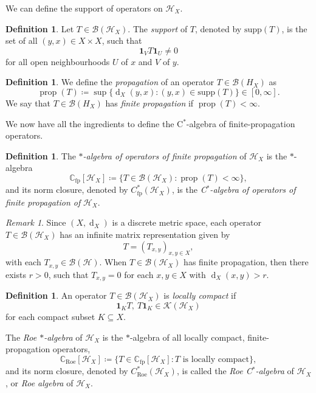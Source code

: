 \documentclass[a4paper]{amsart}
\newcommand{\myhyp}{\textnormal{-}\hskip0pt\relax}
\numberwithin{equation}{section}
\newcommand{\C}{\mathbb{C}}
\newcommand{\Bcal}{\mathcal{B}}
\newcommand{\Hcal}{\mathcal{H}}
\newcommand{\Kcal}{\mathcal{K}}
\newcommand{\indF}{\mathbf{1}}
\newcommand{\cstar}{C$^\ast$\myhyp{}algebra}
\newcommand{\bop}[1]{\Bcal({#1})}
\newcommand{\kop}[1]{\Kcal({#1})}
\newcommand{\Croe}[1]{C^{\ast}_{\mathrm{Roe}}(#1)}
\newcommand{\Cfp}[1]{C^{\ast}_{\mathrm{fp}}({#1})}
\newcommand{\Croesub}[1]{\C_{\mathrm{Roe}}[{#1}]}
\newcommand{\Cfpsub}[1]{\C_{\mathrm{fp}}[{#1}]}
\DeclareMathOperator{\dist}{d}
\newcommand{\supp}[1]{\text{supp}( #1 )}
\newcommand{\prop}[1]{\operatorname{prop} ( {#1} )}
\theoremstyle{plain}
\theoremstyle{indented}
\numberwithin{equation}{section}
\theoremstyle{definition}
\newtheorem{defin}[thm]{Definition}
\theoremstyle{remark}
\newtheorem{rmk}[thm]{Remark}
\theoremstyle{plain}
\theoremstyle{definition}
\begin{document}
We can define the support of operators on ${\Hcal_X}$.

\begin{defin}
    Let 
    ${T \in \bop{\Hcal_X}}$. 
    The \emph{support} of $T$, denoted by $\supp{T}$, 
    is the set of all ${(y,x) \in X \times X}$, such that
    \[\indF_V T \indF_U \ne 0\]
    for all open neighbourhoods $U$ of $x$ and $V$ of $y$.
\end{defin}

\begin{defin}
    We define the \emph{propagation} of an operator ${T \in \bop{H_X}}$ as
    \begin{equation*} 
        \prop{T} \coloneq \sup\{ \dist_X(y,x) \colon (y,x) \in \supp{T} \} \in [0, \infty].
    \end{equation*}
    We say that ${T \in \bop{H_X}}$ has \emph{finite propagation}
    if ${\prop{T} < \infty}$.
\end{defin}
    
We now have all the ingredients to define
the \cstar{} of finite\myhyp{}propagation operators.

\begin{defin}
    The \emph{$\ast$-algebra of operators of finite propagation} of $\Hcal_X$ is the $\ast$-algebra
    \begin{equation*}
        \Cfpsub{\Hcal_X} \coloneq \{ T \in \bop{\Hcal_X} \colon \prop{T} < \infty \},
    \end{equation*}
    and its norm closure, denoted by $\Cfp{\Hcal_X}$, is the \emph{\cstar{} of operators of finite propagation of} ${\Hcal_X}$.  
\end{defin}

\begin{rmk}
    Since ${(X, \dist_X)}$ is a discrete metric space,
    each operator ${T \in \bop{\Hcal_X}}$ has an infinite matrix representation given by
    \[T = (T_{x,y})_{x,y \in X} ,\]
    with each $T_{x,y} \in \bop{\Hcal}$. When ${T \in \bop{\Hcal_X}}$ has finite propagation, 
    then
    there exists ${r >0}$, such that
    ${T_{x,y} = 0}$ for each ${x,y \in X}$ with ${\dist_X(x,y) > r}$.
\end{rmk}

\begin{defin} 
    An operator
    ${T \in \bop{\Hcal_X}}$ is \emph{locally compact}
    if 
    \begin{equation*}
        \indF_K T,~T \indF_K \in \kop{\Hcal_X}
    \end{equation*}
    for each compact subset ${K \subseteq X}$.

    The \emph{Roe $\ast$-algebra} of $\Hcal_X$ is the $\ast$\myhyp{}algebra of all locally compact, finite\myhyp{}propagation operators,
    \begin{equation*}
        \Croesub{\Hcal_X} \coloneq \{ T \in \Cfpsub{\Hcal_X} \colon T \text{ is locally compact} \},
    \end{equation*}
    and its norm closure, denoted by ${\Croe{\Hcal_X}}$, is called the \emph{Roe \cstar{}} of $\Hcal_X$, or \emph{Roe algebra} of $\Hcal_X$.
\end{defin}
\end{document}
